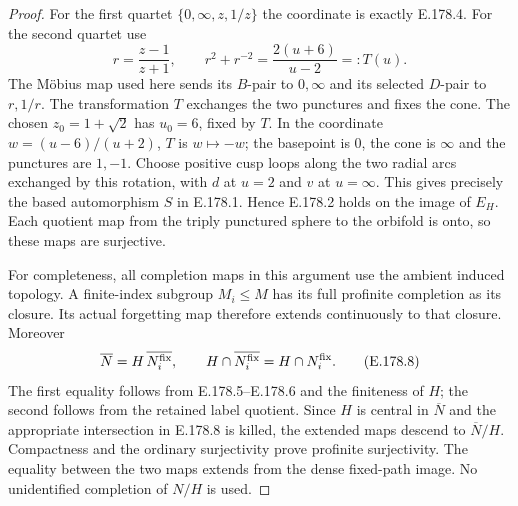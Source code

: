 \begin{proof}
For the first quartet \(\{0,\infty,z,1/z\}\) the
coordinate is exactly E.178.4.  For the second
quartet use
\[
 r=\frac{z-1}{z+1},\qquad
        r^2+r^{-2}=\frac{2(u+6)}{u-2}=:T(u).
\tag{E.178.7}
\]
The Möbius map used here sends its \(B\)-pair
to \(0,\infty\) and its selected \(D\)-pair to
\(r,1/r\).  The transformation \(T\) exchanges
the two punctures and fixes the cone.  The
chosen \(z_0=1+\sqrt2\) has \(u_0=6\), fixed
by \(T\).  In the coordinate
\(w=(u-6)/(u+2)\), \(T\) is \(w\mapsto-w\);
the basepoint is \(0\), the cone is \(\infty\)
and the punctures are \(1,-1\).  Choose positive
cusp loops along the two radial arcs exchanged
by this rotation, with \(d\) at \(u=2\) and
\(v\) at \(u=\infty\).  This gives precisely
the based automorphism \(S\) in E.178.1.
Hence E.178.2 holds on the image of \(E_H\).
Each quotient map from the triply punctured
sphere to the orbifold is onto, so these maps
are surjective.

For completeness, all completion maps in this
argument use the ambient induced topology.
A finite-index subgroup \(M_i\leq M\) has its
full profinite completion as its closure.
Its actual forgetting map therefore extends
continuously to that closure.
Moreover
\[
 \overline N=H\,\overline{N_i^{\rm fix}},\qquad
 H\cap\overline{N_i^{\rm fix}}=H\cap N_i^{\rm fix}.
\tag{E.178.8}
\]
The first equality follows from E.178.5--E.178.6
and the finiteness of \(H\); the second follows
from the retained label quotient.  Since \(H\)
is central in \(\overline N\) and the appropriate
intersection in E.178.8 is killed, the extended
maps descend to \(\overline N/H\).  Compactness
and the ordinary surjectivity prove profinite
surjectivity.  The equality between the two
maps extends from the dense fixed-path image.
No unidentified completion of \(N/H\) is used.
\end{proof}


